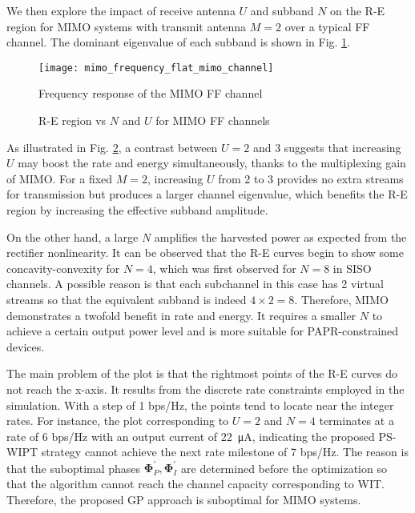 We then explore the impact of receive antenna $U$ and subband $N$ on the R-E region for MIMO systems with transmit antenna $M = 2$ over a typical FF channel. The dominant eigenvalue of each subband is shown in Fig. \ref{fig:mimo-channels}.

\begin{figure}[ht]
  \centering
  \texttt{[image: mimo\_frequency\_flat\_mimo\_channel]}
  \caption{Frequency response of the MIMO FF channel}\label{fig:mimo-channels}
\end{figure}

\begin{figure}[ht]
  \centering
  \caption{R-E region vs $N$ and $U$ for MIMO FF channels}
  \label{fig:re-mimo}
\end{figure}

As illustrated in Fig. \ref{fig:re-mimo}, a contrast between $U = 2$ and 3 suggests that increasing $U$ may boost the rate and energy simultaneously, thanks to the multiplexing gain of MIMO. For a fixed $M = 2$, increasing $U$ from 2 to 3 provides no extra streams for transmission but produces a larger channel eigenvalue, which benefits the R-E region by increasing the effective subband amplitude.

On the other hand, a large $N$ amplifies the harvested power as expected from the rectifier nonlinearity. It can be observed that the R-E curves begin to show some concavity-convexity for $N = 4$, which was first observed for $N = 8$ in SISO channels. A possible reason is that each subchannel in this case has 2 virtual streams so that the equivalent subband is indeed $4 \times 2 = 8$. Therefore, MIMO demonstrates a twofold benefit in rate and energy. It requires a smaller $N$ to achieve a certain output power level and is more suitable for PAPR-constrained devices.

The main problem of the plot is that the rightmost points of the R-E curves do not reach the x-axis. It results from the discrete rate constraints employed in the simulation. With a step of 1 bps/Hz, the points tend to locate near the integer rates. For instance, the plot corresponding to $U = 2$ and $N = 4$ terminates at a rate of 6 bps/Hz with an output current of \SI{22}{\uA}, indicating the proposed PS-WIPT strategy cannot achieve the next rate milestone of 7 bps/Hz. The reason is that the suboptimal phases ${{\mathbf{\Phi }}_P^\prime ,{\mathbf{\Phi }}_I^\prime }$ are determined before the optimization so that the algorithm cannot reach the channel capacity corresponding to WIT. Therefore, the proposed GP approach is suboptimal for MIMO systems.

